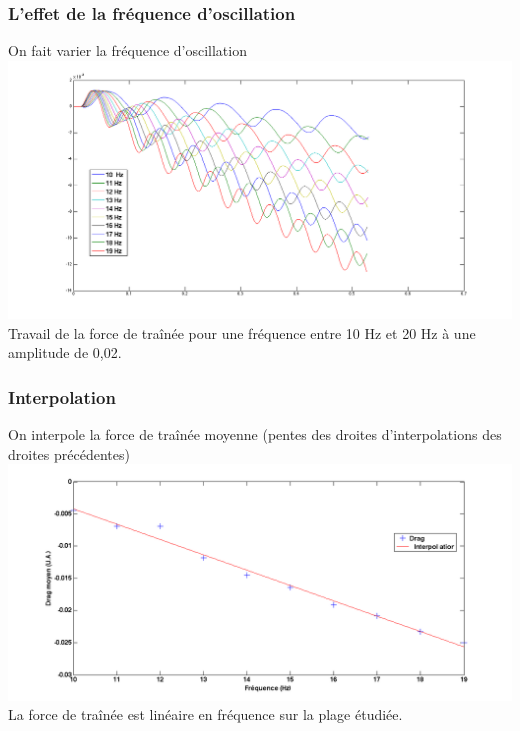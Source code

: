 \documentclass{beamer}
\begin{document}
 \begin{frame}
   \frametitle{L'effet de la fréquence d'oscillation}
   On fait varier la fréquence d'oscillation
   \centering \includegraphics[width= 0.8 \linewidth]{freq0,02.png}\\
   Travail de la force de traînée pour une fréquence entre 10 Hz et 20
   Hz à une amplitude de 0,02\degre. 
 \end{frame}
 	
 \begin{frame}
   \frametitle{Interpolation}
   On interpole la force de traînée moyenne (pentes des droites
   d'interpolations des droites précédentes) 
   \centering \includegraphics[width= 0.8 \linewidth]{modulationfreq.png} \\
   La force de traînée est linéaire en fréquence sur la plage étudiée.
 \end{frame}
\end{document}
